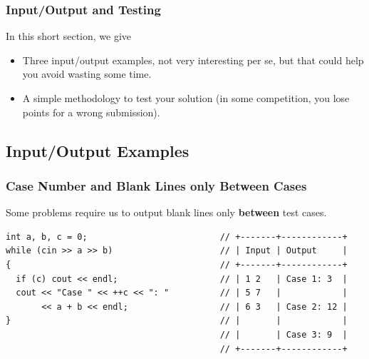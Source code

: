 \documentclass{beamer}
\begin{document}
\begin{frame}[fragile]
\frametitle{Input/Output and Testing}

In this short section, we give

\vspace{0.3cm}

\begin{itemize}

\item<1-> Three input/output examples, not very interesting per se, but that could help you avoid wasting some time.

\vspace{0.3cm}

\item<2-> A simple methodology to test your solution (in some competition, you lose points for a wrong submission).

\end{itemize}

\end{frame}

\subsection{Input/Output Examples}

\begin{frame}[containsverbatim]
\frametitle{Case Number and Blank Lines only Between Cases}
\scriptsize

Some problems require us to output blank lines only \textbf{between} test cases.
\vspace{0.3cm}

\begin{lstlisting}
int a, b, c = 0;                          // +-------+------------+
while (cin >> a >> b)                     // | Input | Output     |
{                                         // +-------+------------+
  if (c) cout << endl;                    // | 1 2   | Case 1: 3  |
  cout << "Case " << ++c << ": "          // | 5 7   |            |
       << a + b << endl;                  // | 6 3   | Case 2: 12 |
}                                         // |       |            |
                                          // |       | Case 3: 9  |
                                          // +-------+------------+
\end{lstlisting}

\end{frame}
\end{document}

